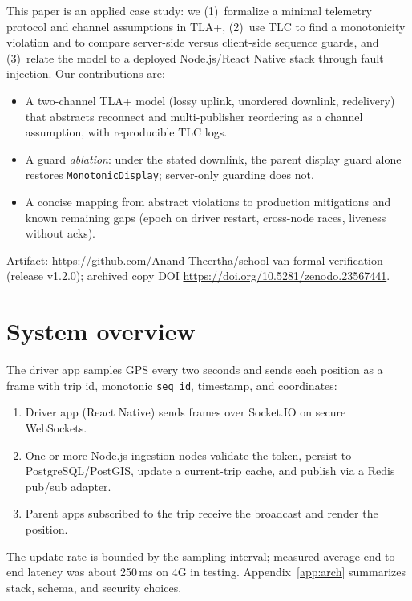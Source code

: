 \documentclass[11pt,a4paper]{article}
\begin{document}
This paper is an applied case study: we (1)~formalize a minimal telemetry protocol and channel assumptions in TLA+, (2)~use TLC to find a monotonicity violation and to compare server-side versus client-side sequence guards, and (3)~relate the model to a deployed Node.js/React Native stack through fault injection. Our contributions are:
\begin{itemize}[noitemsep]
  \item A two-channel TLA+ model (lossy uplink, unordered downlink, redelivery) that abstracts reconnect and multi-publisher reordering as a channel assumption, with reproducible TLC logs.
  \item A guard \emph{ablation}: under the stated downlink, the parent display guard alone restores \texttt{MonotonicDisplay}; server-only guarding does not.
  \item A concise mapping from abstract violations to production mitigations and known remaining gaps (epoch on driver restart, cross-node races, liveness without acks).
\end{itemize}

Artifact: \url{https://github.com/Anand-Theertha/school-van-formal-verification} (release v1.2.0); archived copy DOI \url{https://doi.org/10.5281/zenodo.23567441}.

\section{System overview}
\label{sec:system}

The driver app samples GPS every two seconds and sends each position as a frame with trip id, monotonic \texttt{seq\_id}, timestamp, and coordinates:
\begin{enumerate}[noitemsep]
  \item Driver app (React Native) sends frames over Socket.IO on secure WebSockets.
  \item One or more Node.js ingestion nodes validate the token, persist to PostgreSQL/PostGIS, update a current-trip cache, and publish via a Redis pub/sub adapter.
  \item Parent apps subscribed to the trip receive the broadcast and render the position.
\end{enumerate}

The update rate is bounded by the sampling interval; measured average end-to-end latency was about 250\,ms on 4G in testing. Appendix~\ref{app:arch} summarizes stack, schema, and security choices.
\end{document}
